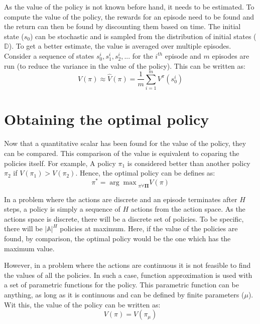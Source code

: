 \documentclass[hidelinks,BTech]{iitmdiss}
\begin{document}
As the value of the policy is not known before hand, it needs to be estimated. To compute the value of the policy, the rewards for an episode need to be found and the return can then be found by discounting them based on time. The initial state ($s_0$) can be stochastic and is sampled from the distribution of initial states ($\mathbb{D}$). To get a better estimate, the value is averaged over multiple episodes. Consider a sequence of states ${s_{0}^{i}, s_{1}^{i}, s_{2}^{i}, ...}$ for the $i^{th}$ episode and $m$ episodes are run (to reduce the variance in the value of the policy). This can be written as:
\begin{equation}
  V(\pi) \approx \hat{V}(\pi) = \frac{1}{m} \sum_{i=1}^{m} V^{\pi} (s_{0}^{i})
\end{equation}

\section{Obtaining the optimal policy}

Now that a quantitative scalar has been found for the value of the policy, they can be compared. This comparison of the value is equivalent to coparing the policies itself. For example, A policy $\pi_{1}$ is considered better than another policy $\pi_{2}$ if $V(\pi_{1}) > V(\pi_{2})$. Hence, the optimal policy can be defines as:
\begin{equation}
  \pi^{*} = {\arg \max}_{\pi \forall \mathbf{\Pi}} {V(\pi)}
\end{equation}

In a problem where the actions are discrete and an episode terminates after $H$ steps, a policy is simply a sequence of $H$ actions from the action space. As the actions space is discrete, there will be a discrete set of policies. To be specific, there will be $|\mathbb{A}|^{H}$ policies at maximum. Here, if the value of the policies are found, by comparison, the optimal policy would be the one which has the maximum value.

However, in a problem where the actions are continuous it is not feasible to find the values of all the policies. In such a case, function approximation is used with a set of parametric functions for the policy. This parametric function can be anything, as long as it is continuous and can be defined by finite parameters ($\mu$). Wit this, the value of the policy can be written as:
\begin{equation}
  V(\pi) = V(\pi_{\mu})
\end{equation}
\end{document}
